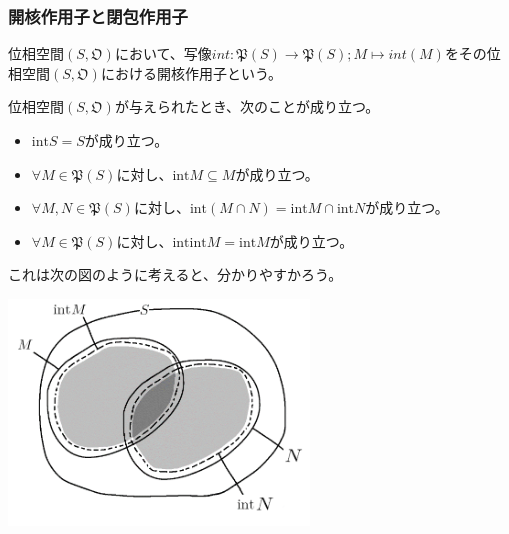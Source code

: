 \documentclass[dvipdfmx]{jsarticle}
\begin{document}
\subsubsection{開核作用子と閉包作用子}%
\begin{dfn}
位相空間$\left( S,\mathfrak{O} \right)$において、写像$int\mathfrak{:P}(S)\mathfrak{\rightarrow P}(S);M \mapsto int(M)$をその位相空間$\left( S,\mathfrak{O} \right)$における開核作用子という。
\end{dfn}
\begin{thm}\label{8.1.1.11}
位相空間$\left( S,\mathfrak{O} \right)$が与えられたとき、次のことが成り立つ。
\begin{itemize}
\item
  ${\mathrm{int}}S = S$が成り立つ。
\item
  $\forall M\in \mathfrak{P}(S)$に対し、${\mathrm{int}}M \subseteq M$が成り立つ。
\item
  $\forall M,N\in \mathfrak{P}(S)$に対し、${\mathrm{int}}(M \cap N) = {\mathrm{int}}M \cap {\mathrm{int}}N$が成り立つ。
\item
  $\forall M\in \mathfrak{P}(S)$に対し、${\mathrm{int}}{{\mathrm{int}}M} = {\mathrm{int}}M$が成り立つ。
\end{itemize}
\end{thm}\par
これは次の図のように考えると、分かりやすかろう。
\begin{center}
  \includegraphics[width=80mm]{8.1.1.d.png}
\end{center}
\end{document}
